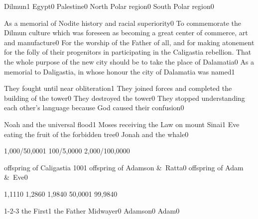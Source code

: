 {Dilmun}{1}
{Egypt}{0}
{Palestine}{0}
{North Polar region}{0}
{South Polar region}{0}
\qstop

{As a memorial of Nodite history and racial superiority}{0}
{To commemorate the Dilmun culture which was foreseen as becoming a great center of commerce, art and manufacture}{0}
{For the worship of the Father of all, and for making atonement for the folly of their progenitors in participating in the Caligastia rebellion. That the whole purpose of the new city should be to take the place of Dalamatia}{0}
{As a memorial to Daligastia, in whose honour the city of Dalamatia was named}{1}
\qstop

{They fought until near obliteration}{1}
{They joined forces and completed the building of the tower}{0}
{They destroyed the tower}{0}
{They stopped understanding each other's language because God caused their confusion}{0}
\qstop

{Noah and the universal flood}{1}
{Moses receiving the Law on mount Sinai}{1}
{Eve eating the fruit of the forbidden tree}{0}
{Jonah and the whale}{0}
\qstop

{1,000/50,000}{1}
{100/5,000}{0}
{2,000/100,000}{0}
\qstop

{offspring of Caligastia 100}{1}
{offspring of Adamson \&\ Ratta}{0}
{offspring of Adam \&\ Eve}{0}
\qstop

{1,111}{0}
{1,286}{0}
{1,984}{0}
{50,000}{1}
{99,984}{0}
\qstop

{1-2-3 the First}{1}
{the Father Midwayer}{0}
{Adamson}{0}
{Adam}{0}
\qstop

